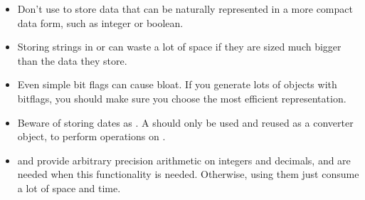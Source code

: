 \begin{itemize}
  \item  Don't use  to store data that can be naturally
  represented in a more compact data form, such as integer or boolean.
  \item Storing strings in  or  can
  waste a lot of space if they are sized much bigger than the data they store.
  \item Even simple bit flags can cause bloat. If you generate lots of objects
  with bitflags, you should make sure you choose the most efficient
  representation.
  \item Beware of storing dates as .  A
   should only be used and reused as a converter
  object, to perform operations on .
  \item {} and  provide arbitrary precision
  arithmetic on integers and decimals, and are needed when this functionality is
  needed. Otherwise, using them just consume a lot of space and time.
\end{itemize}









